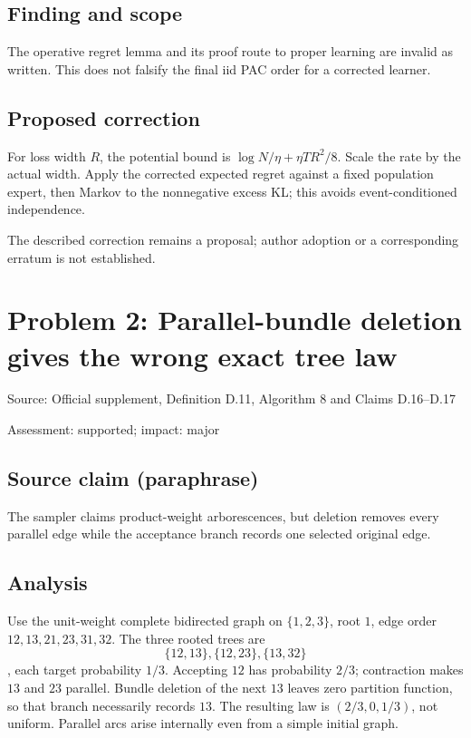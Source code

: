 \documentclass[11pt]{article}
\begin{document}
\subsection*{Finding and scope}

The operative regret lemma and its proof route to proper learning are invalid as written. This does not falsify the final iid PAC order for a corrected learner.

\subsection*{Proposed correction}

For loss width \(R\), the potential bound is \(\log N/\eta+\eta TR^2/8\). Scale the rate by the actual width. Apply the corrected expected regret against a fixed population expert, then Markov to the nonnegative excess KL; this avoids event-conditioned independence.

The described correction remains a proposal; author adoption or a corresponding erratum is not established.

\section*{Problem 2: Parallel-bundle deletion gives the wrong exact tree law}

Source: Official supplement, Definition D.11, Algorithm 8 and Claims D.16–D.17

Assessment: supported; impact: major

\subsection*{Source claim (paraphrase)}

The sampler claims product-weight arborescences, but deletion removes every parallel edge while the acceptance branch records one selected original edge.

\subsection*{Analysis}

Use the unit-weight complete bidirected graph on \(\{1,2,3\}\), root \(1\), edge order \(12,13,21,23,31,32\). The three rooted trees are \[\{12,13\},\{12,23\},\{13,32\}\], each target probability \(1/3\). Accepting \(12\) has probability \(2/3\); contraction makes \(13\) and \(23\) parallel. Bundle deletion of the next \(13\) leaves zero partition function, so that branch necessarily records \(13\). The resulting law is \((2/3,0,1/3)\), not uniform. Parallel arcs arise internally even from a simple initial graph.
\end{document}
